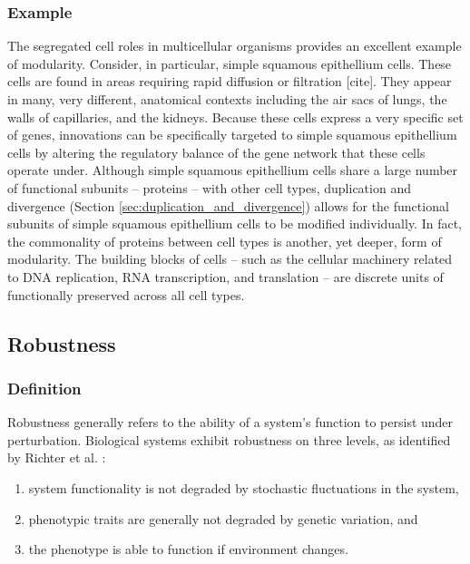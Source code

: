 \subsubsection{Example}
The segregated cell roles in multicellular organisms provides an excellent example of modularity. Consider, in particular, simple squamous epithellium cells. These cells are found in areas requiring rapid diffusion or filtration [cite]. They appear in many, very different, anatomical contexts including the air sacs of lungs, the walls of capillaries, and the kidneys. Because these cells express a very specific set of genes, innovations can be specifically targeted to simple squamous epithellium cells by altering the regulatory balance of the gene network that these cells operate under. Although simple squamous epithellium cells share a large number of functional subunits -- proteins -- with other cell types, duplication and divergence (Section \ref{sec:duplication_and_divergence}) allows for the functional subunits of simple squamous epithellium cells to be modified individually. In fact, the commonality of proteins between cell types is another, yet deeper, form of modularity. The building blocks of cells -- such as the cellular machinery related to DNA replication, RNA transcription, and translation -- are discrete units of functionally preserved across all cell types.

\subsection{Robustness} \label{sec:robustness}
\subsubsection{Definition}
Robustness generally refers to the ability of a system's function to persist under perturbation. Biological systems exhibit robustness on three levels, as identified by Richter et al. \cite{Richter2015EvolvabilitySurvey}:
\begin{enumerate}
    \item system functionality is not degraded by stochastic fluctuations in the system, \label{item:robustness_stochastic}
  	\item phenotypic traits are generally not degraded by genetic variation, and \label{item:robustness_genetic}
    \item the phenotype is able to function if environment changes. \label{item:robustness_environment}
\end{enumerate}
  
